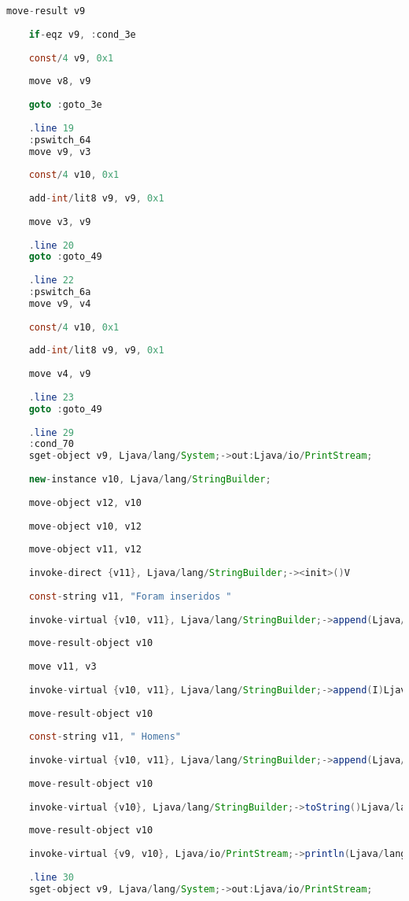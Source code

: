 \documentclass[hidelinks,12pt]{article}
\begin{document}
\begin{lstlisting}[caption=Smali resultante do .java,language=java]
	move-result v9
	
	if-eqz v9, :cond_3e
	
	const/4 v9, 0x1
	
	move v8, v9
	
	goto :goto_3e
	
	.line 19
	:pswitch_64
	move v9, v3
	
	const/4 v10, 0x1
	
	add-int/lit8 v9, v9, 0x1
	
	move v3, v9
	
	.line 20
	goto :goto_49
	
	.line 22
	:pswitch_6a
	move v9, v4
	
	const/4 v10, 0x1
	
	add-int/lit8 v9, v9, 0x1
	
	move v4, v9
	
	.line 23
	goto :goto_49
	
	.line 29
	:cond_70
	sget-object v9, Ljava/lang/System;->out:Ljava/io/PrintStream;
	
	new-instance v10, Ljava/lang/StringBuilder;
	
	move-object v12, v10
	
	move-object v10, v12
	
	move-object v11, v12
	
	invoke-direct {v11}, Ljava/lang/StringBuilder;-><init>()V
	
	const-string v11, "Foram inseridos "
	
	invoke-virtual {v10, v11}, Ljava/lang/StringBuilder;->append(Ljava/lang/String;)Ljava/lang/StringBuilder;
	
	move-result-object v10
	
	move v11, v3
	
	invoke-virtual {v10, v11}, Ljava/lang/StringBuilder;->append(I)Ljava/lang/StringBuilder;
	
	move-result-object v10
	
	const-string v11, " Homens"
	
	invoke-virtual {v10, v11}, Ljava/lang/StringBuilder;->append(Ljava/lang/String;)Ljava/lang/StringBuilder;
	
	move-result-object v10
	
	invoke-virtual {v10}, Ljava/lang/StringBuilder;->toString()Ljava/lang/String;
	
	move-result-object v10
	
	invoke-virtual {v9, v10}, Ljava/io/PrintStream;->println(Ljava/lang/String;)V
	
	.line 30
	sget-object v9, Ljava/lang/System;->out:Ljava/io/PrintStream;
	

\end{lstlisting}
\end{document}
